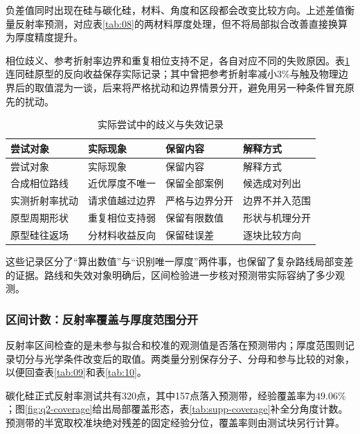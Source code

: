 负差值同时出现在硅与碳化硅，材料、角度和区段都会改变比较方向。上述差值衡量反射率预测，对应表\ref{tab:08}的两材料厚度处理，但不将局部拟合改善直接换算为厚度精度提升。

相位歧义、参考折射率边界和重复相位支持不足，各自对应不同的失败原因。表\ref{tab:supp-failures}连同硅原型的反向收益保存实际记录；其中曾把参考折射率减小$3\%$与触及物理边界后的取值混为一谈，后来将严格扰动和边界情景分开，避免用另一种条件冒充原先的扰动。

\begingroup
\small
\begin{longtable}{>{\centering\arraybackslash}p{}>{\centering\arraybackslash}p{}>{\centering\arraybackslash}p{}>{\centering\arraybackslash}p{}}
\caption{实际尝试中的歧义与失效记录}\label{tab:supp-failures}\\
\toprule
尝试对象 & 实际现象 & 保留内容 & 解释方式 \\
\midrule
\endfirsthead
\toprule
尝试对象 & 实际现象 & 保留内容 & 解释方式 \\
\midrule
\endhead
合成相位路线 & 近优厚度不唯一 & 保留全部案例 & 候选成对列出 \\
实测折射率扰动 & 请求值越过边界 & 严格与边界分开 & 边界不并入范围 \\
原型周期形状 & 重复相位支持弱 & 保留有限数值 & 形状与机理分开 \\
原型硅往返场 & 分材料收益反向 & 保留硅误差 & 逐块比较方向 \\
\bottomrule
\end{longtable}
\endgroup

这些记录区分了“算出数值”与“识别唯一厚度”两件事，也保留了复杂路线局部变差的证据。路线和失效对象明确后，区间检验进一步核对预测带实际容纳了多少观测。

\subsubsection{区间计数：反射率覆盖与厚度范围分开}

反射率区间检查的是未参与拟合和校准的观测值是否落在预测带内；厚度范围则记录切分与光学条件改变后的取值。两类量分别保存分子、分母和参与比较的对象，以便回查表\ref{tab:09}和表\ref{tab:10}。

碳化硅正式反射率测试共有320点，其中157点落入预测带，经验覆盖率为$49.06\%$；图\ref{fig:q2-coverage}给出局部覆盖形态，表\ref{tab:supp-coverage}补全分角度计数。预测带的半宽取校准块绝对残差的固定经验分位，覆盖率则由测试块另行计算。

